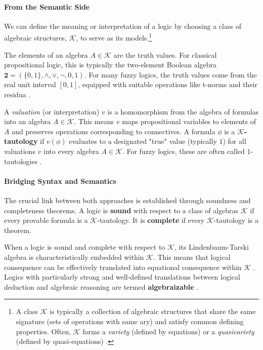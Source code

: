 \paragraph{From the Semantic Side} We can define the meaning or interpretation of a logic by choosing a class of algebraic structures, $\mathcal{K}$, to serve as its models.\footnote{A class $\mathcal{K}$ is typically a collection of algebraic structures that share the same signature (sets of operations with same ary) and satisfy common defining properties. Often, $\mathcal{K}$ forms a \textit{variety} (defined by equations) or a \textit{quasivariety} (defined by quasi-equations) \cite[Def.~2.2]{BlokPigozzi1989}.}

The elements of an algebra $A \in \mathcal{K}$ are the truth values. For classical propositional logic, this is typically the two-element Boolean algebra $\mathbf{2} = (\{0,1\}, \land, \lor, \neg, 0, 1)$. For many fuzzy logics, the truth values come from the real unit interval $[0,1]$, equipped with suitable operations like t-norms and their residua \cite[Ch.~2]{Hajek1998}.

A \textit{valuation} (or interpretation) $v$ is a homomorphism from the algebra of formulas into an algebra $A \in \mathcal{K}$. This means $v$ maps propositional variables to elements of $A$ and preserves operations corresponding to connectives. A formula $\phi$ is a $\mathcal{K}$\textbf{-tautology} if $v(\phi)$ evaluates to a designated "true" value (typically $1$) for all valuations $v$ into every algebra $A \in \mathcal{K}$. For fuzzy logics, these are often called $1$-tautologies \cite[Ch.~2]{Hajek1998}.

\paragraph{Bridging Syntax and Semantics} The crucial link between both approaches is established through soundness and completeness theorems. A logic is \textbf{sound} with respect to a class of algebras $\mathcal{K}$ if every provable formula is a $\mathcal{K}$-tautology. It is \textbf{complete} if every $\mathcal{K}$-tautology is a theorem.

When a logic is sound and complete with respect to $\mathcal{K}$, its Lindenbaum-Tarski algebra is characteristically embedded within $\mathcal{K}$. This means that logical consequence can be effectively translated into equational consequence within $\mathcal{K}$ \cite[Abstract]{BlokPigozzi1989}. Logics with particularly strong and well-defined translations between logical deduction and algebraic reasoning are termed \textbf{algebraizable} \cite[Def.~2.10]{BlokPigozzi1989}.\\

